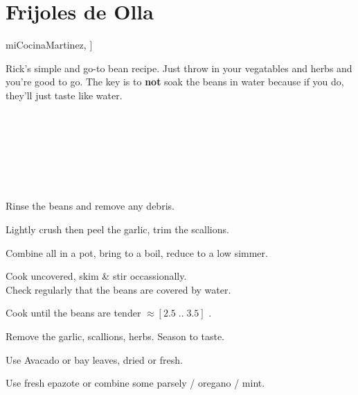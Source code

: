 \section{Frijoles de Olla}


\begin{recipestats}[
	servings=12 $C$,
	preptime=15 \minute,
	bakingtime=3 \hour,
	original=\citeauthor{miCocinaMartinez}~\cite[p.54]{miCocinaMartinez},
]
\end{recipestats}


\begin{recipeabstract}
	Rick's simple and go-to bean recipe.
	Just throw in your vegatables and herbs and you're good to go.
	The key is to \textbf{not} soak the beans in water because if you do, they'll just taste like water.
\end{recipeabstract}


\begin{ingredientcolumns}
	\begin{ingredientblock}
		\\
		\\
		\\
	\end{ingredientblock}

	\begin{ingredientblock}
		\ingredient[2][leaves]{avocado}\\
		\ingredient[3][sprigs]{epazote}\\
		\ingredient[17][g]{salt}
	\end{ingredientblock}
\end{ingredientcolumns}


\begin{preparation}
	\item Rinse the beans and remove any debris.
	\item Lightly crush then peel the garlic, trim the scallions.
	\item Combine all in a pot, bring to a boil, reduce to a low simmer.
	\item Cook uncovered, skim \& stir occassionally.\\
		Check regularly that the beans are covered by water.
	\item Cook until the beans are tender $\approx[2.5\;..\; 3.5]$ \hour.
	\item Remove the garlic, scallions, herbs. Season to taste.
\end{preparation}


\begin{variation}
	\item Use Avacado or bay leaves, dried or fresh.
	\item Use fresh epazote or combine some parsely / oregano / mint.
\end{variation}


\recipeend%
